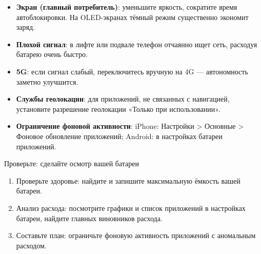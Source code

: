 
\begin{itemize}
  \item \textbf{Экран (главный потребитель)}: уменьшите яркость, сократите время автоблокировки. На OLED-экранах тёмный режим существенно экономит заряд.
  \item \textbf{Плохой сигнал}: в лифте или подвале телефон отчаянно ищет сеть, расходуя батарею очень быстро.
  \item \textbf{5G}: если сигнал слабый, переключитесь вручную на 4G — автономность заметно улучшится.
  \item \textbf{Службы геолокации}: для приложений, не связанных с навигацией, установите разрешение геолокации «Только при использовании».
  \item \textbf{Ограничение фоновой активности}: iPhone: Настройки > Основные > Фоновое обновление приложений; Android: в настройках батареи приложений.
\end{itemize}

\begin{tcbpractice}{Проверьте: сделайте осмотр вашей батареи}
\begin{enumerate}
  \item Проверьте здоровье: найдите и запишите максимальную ёмкость вашей батареи.
  \item Анализ расхода: посмотрите графики и список приложений в настройках батареи, найдите главных виновников расхода.
  \item Составьте план: ограничьте фоновую активность приложений с аномальным расходом.
\end{enumerate}

\end{tcbpractice}
